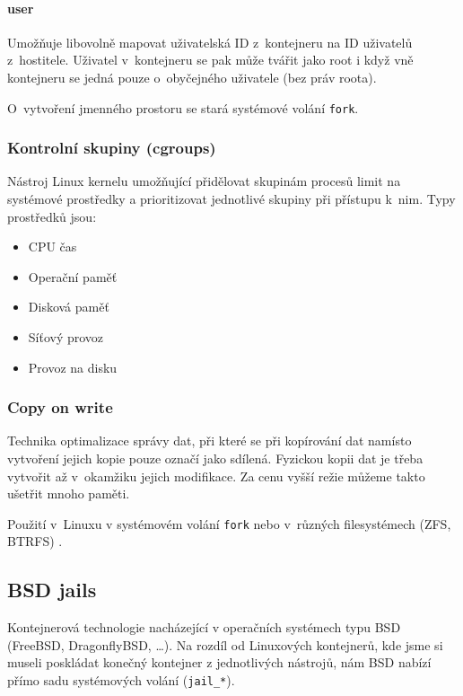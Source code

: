 \paragraph{user}

Umožňuje libovolně mapovat uživatelská ID z~kontejneru na ID uživatelů z~hostitele.
Uživatel v~kontejneru se pak může tvářit jako root i když vně kontejneru se jedná pouze o~obyčejného uživatele (bez práv roota).
\cite{user_namespaces}


O~vytvoření jmenného prostoru se stará systémové volání \verb|fork|.

\subsubsection{Kontrolní skupiny (cgroups)}

Nástroj Linux kernelu umožňující přidělovat skupinám procesů limit na systémové prostředky a prioritizovat jednotlivé skupiny při přístupu k~nim.
Typy prostředků jsou:
\begin{itemize}
	\item CPU čas
	\item Operační paměť
	\item Disková paměť
	\item Síťový provoz
	\item Provoz na disku
\end{itemize}

\subsubsection{Copy on write}

Technika optimalizace správy dat, při které se při kopírování dat namísto vytvoření jejich kopie pouze označí jako sdílená.
Fyzickou kopii dat je třeba vytvořit až v~okamžiku jejich modifikace.
Za cenu vyšší režie můžeme takto ušetřit mnoho paměti.
\cite{copy_on_write}

Použití v~Linuxu v systémovém volání \verb|fork| \cite{fork_manual} nebo v~různých filesystémech (ZFS, BTRFS) \cite{fs_cow}.

\subsection{BSD jails}

Kontejnerová technologie nacházející v operačních systémech typu BSD (FreeBSD, DragonflyBSD, \ldots).
Na rozdíl od Linuxových kontejnerů, kde jsme si museli poskládat konečný kontejner z jednotlivých nástrojů, nám BSD nabízí přímo sadu systémových volání (\verb|jail_*|).

